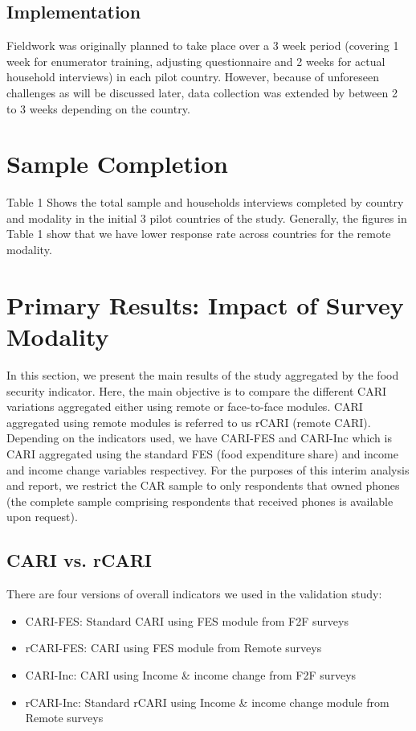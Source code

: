 \documentclass[11pt,harvard]{article}
\begin{document}
	\subsection{Implementation}
	
	Fieldwork was originally planned to take place over a 3 week period (covering 1 week for enumerator training, adjusting questionnaire and 2 weeks for actual household interviews) in each pilot country. However, because of unforeseen challenges as will be discussed later, data collection was extended by between 2 to 3 weeks depending on the country.
	
	\pagebreak
	
	\section{Sample Completion}
	Table 1 Shows the total sample and households interviews completed by country and modality in the initial 3 pilot countries of the study. Generally, the figures in Table 1 show that we have lower response rate across countries for the remote modality.
	
	 
	\label{tab:rCARI_Overall_Completion}
	
	\pagebreak
	
	\section{Primary Results: Impact of Survey Modality}
	
	In this section, we present the main results of the study aggregated by the food security indicator. Here, the main objective is to compare the different CARI variations aggregated either using remote or face-to-face modules.
	CARI aggregated using remote modules is referred to us rCARI (remote CARI). Depending on the indicators used, we have CARI-FES and CARI-Inc which is CARI aggregated using the standard FES (food expenditure share) and income and income change variables respectivey. 
	For the purposes of this interim analysis and report, we restrict the CAR sample to only respondents that owned phones (the complete sample comprising respondents that received phones is available upon request).  
	
	\subsection{CARI vs. rCARI}
	There are four versions of overall indicators we used in the validation study:
	\begin{itemize}[label=--, left=1.5em]
		\item CARI-FES: Standard CARI using FES module from F2F surveys
		\item rCARI-FES: CARI using FES module from Remote surveys
		\item CARI-Inc: CARI using Income & income change from F2F surveys
		\item rCARI-Inc: Standard rCARI using Income & income change module from Remote surveys
	\end{itemize}
	
\end{document}
